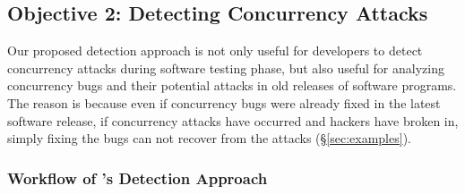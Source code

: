 





\vspace{-.15in}\subsection{Objective 2: Detecting Concurrency 
Attacks}\label{sec:detect}\vspace{-.075in}


Our proposed detection approach is not only useful for developers to detect 
concurrency attacks during software testing phase, but also useful for 
analyzing concurrency bugs and their potential attacks in old releases of 
software programs. The reason is because even if 
concurrency bugs were already fixed in the latest software release, if 
concurrency attacks have occurred and hackers have broken in, simply fixing 
the bugs can not recover from the attacks (\S\ref{sec:examples}).


\vspace{-.15in}\subsubsection{Workflow of \xxx's Detection Approach}
\label{sec:detect-arch}\vspace{-.075in}

